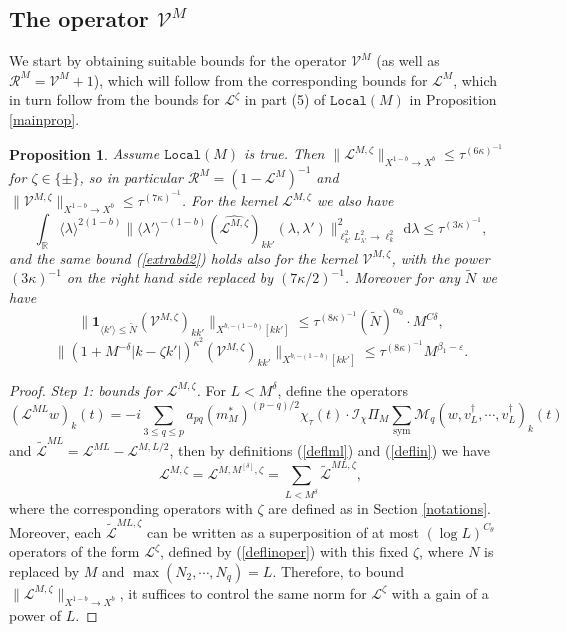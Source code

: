 \documentclass[11 pt,reqno]{amsart}
\newtheorem{prop}[thm]{Proposition}
\theoremstyle{definition}
\theoremstyle{remark}
\numberwithin{equation}{section}
\newcommand{\Ic}{\mathcal{I}}
\renewcommand{\Mc}{\mathcal{M}}
\newcommand{\Rb}{\mathbb{R}}
\newcommand{\Ls}{\mathscr{L}}
\newcommand{\Rs}{\mathscr{R}}
\newcommand{\Vs}{\mathscr{V}}
\begin{document}
{\subsection{The operator $\Vs^M$} We start by obtaining suitable bounds for the operator $\Vs^M$ (as well as $\Rs^M=\Vs^M+1$), which will follow from the corresponding bounds for $\Ls^M$, which in turn follow from the bounds for $\Ls^\zeta$ in part (5) of $\mathtt{Local}(M)$ in Proposition \ref{mainprop}.
\begin{prop}\label{linextra} Assume $\mathtt{Local}(M)$ is true. Then $\|\Ls^{M,\zeta}\|_{X^{1-b}\to X^{b}}\leq\tau^{(6\kappa)^{-1}}$ for $\zeta\in\{\pm\}$, so in particular $\Rs^M=(1-\Ls^M)^{-1}$ and $\|\Vs^{M,\zeta}\|_{X^{1-b}\to X^b}\leq \tau^{(7\kappa)^{-1}}$. For the kernel $\Ls^{M,\zeta}$ we also have
\begin{equation}\label{extrabd2}\int_{\Rb}\langle\lambda\rangle^{2(1-b)}\|\langle\lambda'\rangle^{-(1-b)}(\widehat{\Ls^{M,\zeta}})_{kk'}(\lambda,\lambda')\|_{\ell_{k'}^2L_{\lambda'}^2\to \ell_k^2}^2\,\mathrm{d}\lambda\leq\tau^{(3\kappa)^{-1}},
\end{equation} and the same bound (\ref{extrabd2}) holds also for the kernel $\Vs^{M,\zeta}$, with the power $(3\kappa)^{-1}$ on the right hand side replaced by $(7\kappa/2)^{-1}$. Moreover for any $\widetilde{N}$ we have
\begin{equation}\label{opervmbd2}\|\mathbf{1}_{\langle k'\rangle\leq \widetilde{N}}(\Vs^{M,\zeta})_{kk'}\|_{X^{b,-(1-b)}[kk']}\leq \tau^{(8\kappa)^{-1}}(\widetilde{N})^{\alpha_0}\cdot M^{C\delta},
\end{equation}
\begin{equation}\label{opervmbd3}\|(1+M^{-\delta}|k-\zeta k'|)^{\kappa^2}(\Vs^{M,\zeta})_{kk'}\|_{X^{b,-(1-b)}[k k']}\leq \tau^{(8\kappa)^{-1}}M^{\beta_1-\varepsilon}.
\end{equation}
\end{prop}
\begin{proof} \emph{Step 1: bounds for $\Ls^{M,\zeta}$.} For $L<M^\delta$, define the operators
\begin{equation}\label{deflml}(\Ls^{ML}w)_k(t)=-i\sum_{3\leq q\leq p}a_{pq}(m_M^*)^{(p-q)/2} \chi_\tau(t)\cdot\Ic_\chi\Pi_M\sum_{\mathrm{sym}}\Mc_q(w,v_{L}^\dagger,\cdots,v_{L}^\dagger)_k(t)
\end{equation} and $\widetilde{\Ls}^{ML}=\Ls^{ML}-\Ls^{M,L/2}$, then by definitions (\ref{deflml}) and (\ref{deflin}) we have 
\[\Ls^{M,\zeta}=\Ls^{M,M^{[\delta]},\zeta}=\sum_{L<M^\delta}\widetilde{\Ls}^{ML,\zeta},\] 
where the corresponding operators with $\zeta$ are defined as in Section \ref{notations}.
Moreover, each $\widetilde{\Ls}^{ML,\zeta}$  can be written as a superposition of at most $(\log L)^{C_\theta}$ operators of the form $\Ls^\zeta$, defined by (\ref{deflinoper}) with this fixed $\zeta$, where $N$ is replaced by $M$ and $\max(N_2,\cdots,N_{q})=L$. Therefore, to bound $\|\Ls^{M,\zeta}\|_{X^{1-b}\to X^{b}}$, it suffices to control the same norm for $\Ls^\zeta$ with a gain of a power of $L$.



\end{proof}}
\end{document}
